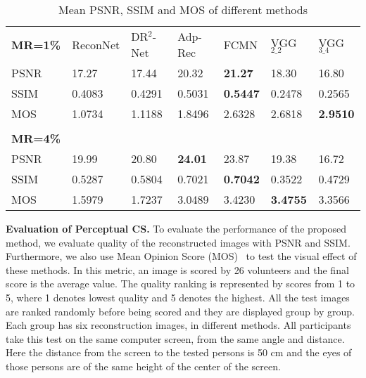\documentclass[runningheads]{llncs}
\begin{document}
\setlength{\tabcolsep}{4pt}
\begin{table}[!b]
\begin{center}
\caption{Mean PSNR, SSIM and MOS of different methods}
\label{table:PSNR}
\begin{tabular}{p{1.5cm}p{1.4cm}<{\centering}p{1.4cm}<{\centering}p{1.4cm}<{\centering}p{1.4cm}<{\centering}p{1.4cm}<{\centering}p{1.4cm}<{\centering} }
\textbf{MR=1\%} & ReconNet & DR$^2$-Net & Adp-Rec & FCMN & VGG$_{2\_2}$ & VGG$_{3\_4}$\\
\noalign{\smallskip}
\hline
\noalign{\smallskip}
PSNR        & 17.27 & 17.44 & 20.32 & \textbf{21.27} & 18.30 & 16.80\\
SSIM     & 0.4083 & 0.4291 & 0.5031 & \textbf{0.5447} & 0.2478& 0.2565\\
MOS        & 1.0734 & 1.1188 & 1.8496 & 2.6328 & 2.6818& \textbf{\textcolor[rgb]{1.00,0.00,0.00}{2.9510}}\\
         \\
\textbf{MR=4\%}\\
\noalign{\smallskip}
\hline
\noalign{\smallskip}
PSNR        & 19.99 & 20.80 & \textbf{24.01} & 23.87 & 19.38  & 16.72\\
SSIM     & 0.5287 & 0.5804 & 0.7021 & \textbf{0.7042} & 0.3522 & 0.4729\\
MOS        & 1.5979 & 1.7237 & 3.0489 & 3.4230 & \textbf{\textcolor[rgb]{1.00,0.00,0.00}{3.4755}} & 3.3566\\
\end{tabular}
\end{center}
\end{table}
\setlength{\tabcolsep}{1.4pt}

{\bf Evaluation of Perceptual CS.}  To evaluate the performance of the proposed method, we evaluate quality of the reconstructed images with PSNR and SSIM.
Furthermore, we also use Mean Opinion Score (MOS)~\cite{recommendatios2000recommendation} to test the visual effect of these methods.
In this metric, an image is scored by 26 volunteers and the final score is the average value.
The quality ranking is represented by scores from 1 to 5, where 1 denotes lowest quality and 5 denotes the highest.
All the test images are ranked randomly before being scored and they are displayed group by group. Each group has six reconstruction images, in different methods. All participants take this test on the same computer screen, from the same angle and distance. Here the distance from the screen to the tested persons is 50 cm and the eyes of those persons are of the same height of the center of the screen.
\end{document}
